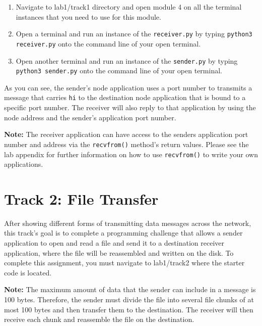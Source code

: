 \documentclass[11pt]{article}
\begin{document}

\begin{enumerate}
    \item Navigate to lab1/track1 directory and open module 4 on all the terminal instances that you need to use for this module.
    \item Open a terminal and run an instance of the \texttt{receiver.py} by typing \texttt{python3 receiver.py} onto the command line of your open terminal.
    \item Open another terminal and run an instance of the \texttt{sender.py} by typing \texttt{python3 sender.py} onto the command line of your open terminal.
\end{enumerate}

As you can see, the sender's node application uses a port number to transmits a message that carries \texttt{hi} to the destination node application that is bound to a specific port number. The receiver will also reply to that application by using the node address and the sender's application port number.

\textbf{Note:}
The receiver application can have access to the senders application port number and address via the \texttt{recvfrom()} method's return values. Please see the lab appendix for further information on how to use \texttt{recvfrom()} to write your own applications.

\section{Track 2: File Transfer}
\label{sec:track2}
After showing different forms of transmitting data messages across the network, this track's goal is to complete a programming challenge that allows a sender application to open and read a file and send it to a destination receiver application, where the file will be reassembled and written on the disk.
To complete this assignment, you must navigate to lab1/track2 where the starter code is located.

\textbf{Note:}
The maximum amount of data that the sender can include in a message is 100 bytes. Therefore, the sender must divide the file into several file chunks of at most 100 bytes and then transfer them to the destination. The receiver will then receive each chunk and reassemble the file on the destination.
\end{document}
